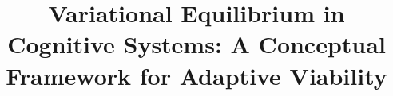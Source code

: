 \title{Variational Equilibrium in Cognitive Systems: A Conceptual Framework for Adaptive Viability}
